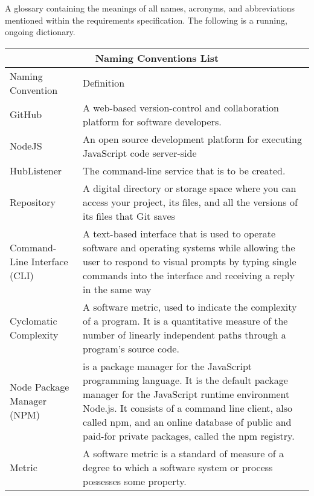 \documentclass{article}
\begin{document}
A glossary containing the meanings of all names, acronyms, and abbreviations mentioned within the requirements specification. The following is a running, ongoing dictionary. 
\newline
\begin{tabular}{ |p{6cm}||p{6cm}| }
\hline
\multicolumn{2}{|c|}{Naming Conventions List} \\
\hline
Naming Convention & Definition\\
\hline 
GitHub & A web-based version-control and collaboration platform for software developers. \\
\hline
NodeJS & An open source development platform for executing JavaScript code server-side \\
\hline
HubListener & The command-line service that is to be created.\\
\hline
Repository & A digital directory or storage space where you can access your project, its files, and all the versions of its files that Git saves\\
\hline
Command-Line Interface (CLI) & A text-based interface that is used to operate software and operating systems while allowing the user to respond to visual prompts by typing single commands into the interface and receiving a reply in the same way\\
\hline
Cyclomatic Complexity & A software metric, used to indicate the complexity of a program. It is a quantitative measure of the number of linearly independent paths through a program's source code.\\
\hline 
Node Package Manager (NPM) & is a package manager for the JavaScript programming language. It is the default package manager for the JavaScript runtime environment Node.js. It consists of a command line client, also called npm, and an online database of public and paid-for private packages, called the npm registry.\\
\hline 
Metric &A software metric is a standard of measure of a degree to which a software system or process possesses some property.\\
\hline 
\end{tabular}
\newpage
\end{document}
